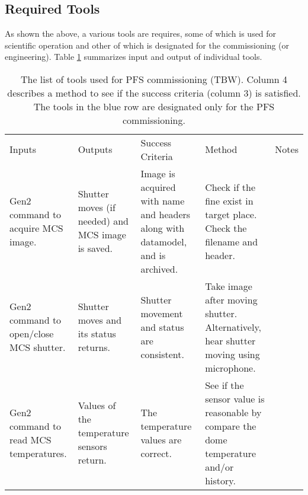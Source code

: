 \subsection{Required Tools}\label{sec:required_tools}
As shown the above, a various tools are requires, some of which is used for scientific operation and other of which is designated for the commissioning (or engineering).
Table \ref{tbl:tools} summarizes input and output of individual tools.



\begin{landscape}
\begin{longtable}{p{42mm}|p{42mm}|p{40mm}|p{50mm}|p{35mm}}
\caption{
The list of tools used for PFS commissioning (TBW). 
Column 4 describes a method to see if the success criteria (column 3) is satisfied. 
The tools in the blue row are designated only for the PFS commissioning.}
\label{tbl:tools} 
\footnotesize
\endhead
\endfoot
\hline
\multicolumn{5}{c}{ \ref{secflow:MCSoff} and \ref{secflow:MCSon}: Initial check of MCS} \\ \hline
Inputs	& Outputs & Success Criteria & Method & Notes \\ \arrayrulecolor[rgb]{0.63,0.79,0.95}\hline \hline \arrayrulecolor{black}
Gen2 command to acquire MCS image. 	&  Shutter moves (if needed) and MCS image is saved.	& Image is acquired with name and headers along with datamodel, and is archived. & Check if the fine exist in target place. Check the filename and header. & \\  \hline
Gen2 command to open/close MCS shutter. 	&  Shutter moves and its status returns.	& Shutter movement and status are consistent.	& Take image after moving shutter. Alternatively, hear shutter moving using microphone. & 	\\  \hline
Gen2 command to read MCS temperatures. 	&  Values of the temperature sensors return. 	& The temperature values are correct.	& See if the sensor value is reasonable by compare the dome temperature and/or history. & \\  \hline

\end{longtable}
\end{landscape}
